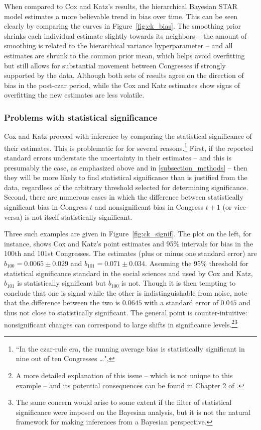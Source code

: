 When compared to Cox and Katz's results, the hierarchical Bayesian STAR model estimates 
a more believable trend in bias over time. This can be seen clearly by comparing the curves 
in Figure~\ref{fig:ck_bias}. The smoothing prior shrinks each individual estimate slightly 
towards its neighbors -- the amount of smoothing is related to the hierarchical variance 
hyperparameter -- and all estimates are shrunk to the common prior mean, which helps 
avoid overfitting but still allows for substantial movement between Congresses 
if strongly supported by the data. Although both sets of results agree on the direction of 
bias in the post-czar period, while the Cox and Katz estimates show signs of overfitting 
the new estimates are less volatile. 


\subsubsection{Problems with statistical significance}

Cox and Katz proceed with inference by comparing the statistical significance of their 
estimates. This is problematic for for several reasons.\footnote{``In the czar-rule era, 
the running average bias is statistically significant in nine out of ten Congresses \dots", } 
First, if the reported standard errors understate the uncertainty in their estimates 
-- and this is presumably the case, as emphasized above and in \ref{subsection_methods} 
-- then they will be more likely to find statistical significance than is justified from the data, 
regardless of the arbitrary threshold selected for determining significance. Second, there
are numerous cases in which the difference between statistically significant 
bias in Congress $t$ and nonsignificant bias in Congress $t + 1$ (or vice-versa) is not itself 
statistically significant. 

Three such examples are given in Figure~\ref{fig:ck_signif}. The plot on the left, for instance, 
shows Cox and Katz's point estimates and 95\% intervals for bias in the 100th and 101st 
Congresses. The estimates (plus or minus one standard error) are $b_{100} = 0.0065 \pm 0.029$ 
and $b_{101} = 0.071 \pm 0.034$. Assuming the 95\% threshold for statistical significance 
standard in the social sciences and used by Cox and Katz, $b_{101}$ is statistically significant 
but $b_{100}$ is not. Though it is then tempting to conclude that one is signal while the other 
is indistinguishable from noise, note that the difference between the two is 
$0.0645$ with a standard error of $0.045$ and thus not close to statistically significant. 
The general point is counter-intuitive: nonsignificant changes can correspond to large shifts 
in significance levels.\footnote{A more detailed explanation of this issue -- which is not unique to this 
example -- and its potential consequences can be found in Chapter 2 of 
.}\footnote{The same concern would arise to some extent if the filter 
of statistical significance were imposed on the Bayesian analysis, but it is not the natural framework 
for making inferences from a Bayesian perspective.} 

